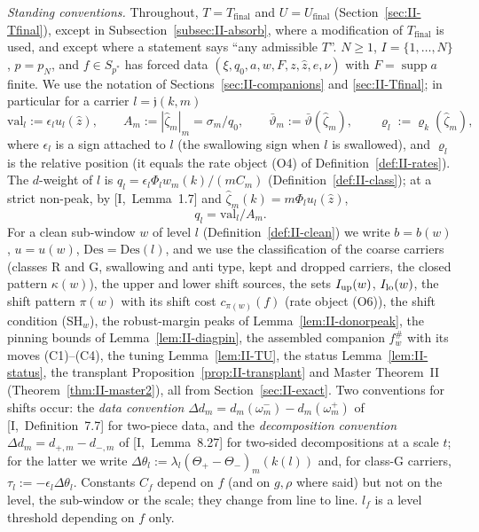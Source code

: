 \documentclass[10pt]{amsart}
\theoremstyle{definition}
\theoremstyle{remark}
\newcommand{\supp}{\operatorname{supp}}
\newcommand{\zh}{\hat z}
\begin{document}
\smallskip\noindent\emph{Standing conventions.}  Throughout,
$T=T_{\mathrm{final}}$ and $U=U_{\mathrm{final}}$ (Section~\ref{sec:II-Tfinal}),
except in Subsection~\ref{subsec:II-absorb}, where a modification of
$T_{\mathrm{final}}$ is used, and except where a statement says ``any
admissible $T$''.  $N\ge1$, $I=\{1,\dots,N\}$, $p=p_N$, and $f\in
S_{p^*}$ has forced data $(\xi,q_0,a,w,F,z,\zh,e,\nu)$ with $F=\supp a$
finite.  We use the notation of Sections~\ref{sec:II-companions} and
\ref{sec:II-Tfinal}; in particular for a carrier $l=\mathfrak j(k,m)$
\[
 \mathrm{val}_l:=\epsilon_lu_l(\zh),\qquad A_m:=|\hat\zeta_m|_m=\sigma_m/q_0,
 \qquad \bar\vartheta_m:=\bar\vartheta(\hat\zeta_m),\qquad
 \varrho_l:=\varrho_{k}(\hat\zeta_m),
\]
where $\epsilon_l$ is a sign attached to $l$ (the swallowing sign when $l$
is swallowed), and $\varrho_l$ is the relative position (it equals the rate
object (O4) of Definition~\ref{def:II-rates}).  The $d$-weight of
$l$ is $q_l=\epsilon_l\Phi_lw_m(k)/(mC_m)$ (Definition~\ref{def:II-class}); at a strict non-peak,
by [I,~Lemma~1.7] and $\hat\zeta_m(k)=m\Phi_lu_l(\zh)$,
\begin{equation}\label{eq:II-qval}
 q_l=\mathrm{val}_l/A_m .
\end{equation}
For a clean sub-window $w$ of level $l$ (Definition~\ref{def:II-clean}) we
write $b=b(w)$, $u=u(w)$, $\mathrm{Des}=\mathrm{Des}(l)$, and we use the
classification of the coarse carriers (classes R and G, swallowing and
anti type, kept and dropped carriers, the closed pattern $\kappa(w)$), the
upper and lower shift sources, the sets $I_{\rm up}(w)$, $I_{\rm lo}(w)$,
the shift pattern $\pi(w)$ with its shift cost $c_{\pi(w)}(f)$ (rate object
(O6)), the shift condition (SH$_w$), the robust-margin peaks of
Lemma~\ref{lem:II-donorpeak}, the pinning bounds of Lemma~\ref{lem:II-diagpin}, the
assembled companion $f^\#_w$ with its moves (C1)--(C4), the tuning
Lemma~\ref{lem:II-TU}, the status Lemma~\ref{lem:II-status}, the transplant
Proposition~\ref{prop:II-transplant} and Master Theorem~II
(Theorem~\ref{thm:II-master2}), all from Section~\ref{sec:II-exact}.
Two conventions for shifts occur: the \emph{data convention}
$\Delta d_m=d_m(\omega^-_m)-d_m(\omega^+_m)$ of [I,~Definition~7.7] for
two-piece data, and the \emph{decomposition convention}
$\Delta d_m=d_{+,m}-d_{-,m}$ of [I,~Lemma~8.27] for two-sided
decompositions at a scale $t$; for the latter we write
$\Delta\theta_l:=\lambda_l(\Theta_+-\Theta_-)_m(k(l))$ and, for class-G
carriers, $\tau_l:=-\epsilon_l\Delta\theta_l$.  Constants $C_f$ depend on
$f$ (and on $g,\rho$ where said) but not on the level, the sub-window or
the scale; they change from line to line.  $l_f$ is a level threshold
depending on $f$ only.
\end{document}
